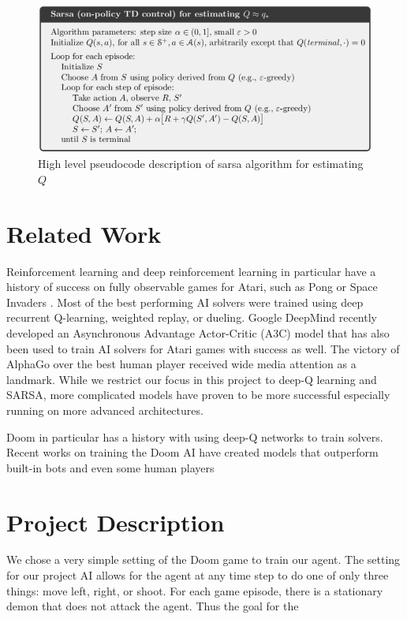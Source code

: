 \documentclass[letterpaper]{article} %
\begin{document}
\begin{figure}
\label{sarsa}
  \includegraphics[width = \textwidth]{sarsa_algo}
  \caption{High level pseudocode description of sarsa algorithm for estimating $Q$}
\end{figure}



\section{Related Work}
Reinforcement learning and deep reinforcement learning in particular have a history of success on fully observable games for Atari, such as Pong or Space Invaders \cite{playing_atari}. Most of the best performing AI solvers were trained using deep recurrent Q-learning, weighted replay, or dueling. Google DeepMind recently developed an Asynchronous Advantage Actor-Critic (A3C) model that has also been used to train AI solvers for Atari games with success as well. The victory of AlphaGo over the best human player received wide media attention as a landmark. While we restrict our focus in this project to deep-Q learning and SARSA, more complicated models have proven to be more successful especially running on more advanced architectures. 

Doom in particular has a history with using deep-Q networks to train solvers. Recent works on training the Doom AI have created models that outperform built-in bots and even some human players  


\section{Project Description}
We chose a very simple setting of the Doom game to train our agent. The setting for our project AI allows for the agent at any time step to do one of only three things: move left, right, or shoot. For each game episode, there is a stationary demon that does not attack the agent. Thus the goal for the 
\end{document}
